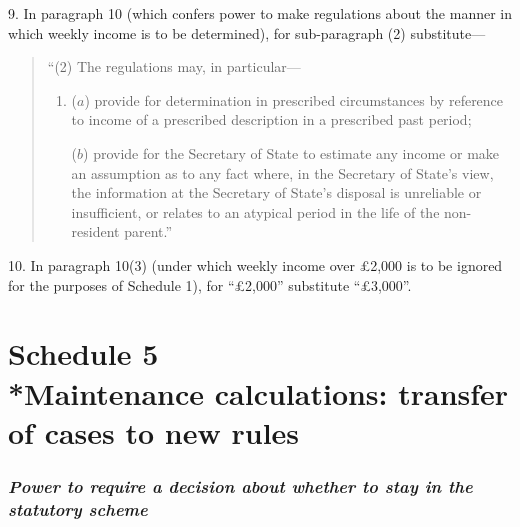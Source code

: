 \documentclass[12pt,a4paper]{article}
\begin{document}
9. In paragraph 10 (which confers power to make regulations about the manner in which weekly income is to be determined), for sub-paragraph (2) substitute—
\begin{quotation}
“(2) The regulations may, in particular—
\begin{enumerate}\item[]
($a$) provide for determination in prescribed circumstances by reference to income of a prescribed description in a prescribed past period;

($b$) provide for the Secretary of State to estimate any income or make an assumption as to any fact where, in the Secretary of State's view, the information at the Secretary of State's disposal is unreliable or insufficient, or relates to an atypical period in the life of the non-resident parent.”
\end{enumerate}
\end{quotation}


\medskip

10. In paragraph 10(3) (under which weekly income over £2,000 is to be ignored for the purposes of Schedule 1), for “£2,000” substitute “£3,000”.

\part[Schedule 5 --- Maintenance calculations: transfer of cases to new rules]{Schedule 5\\*Maintenance calculations: transfer of cases to new rules}

\renewcommand\parthead{--- Schedule 5}

\section*{\itshape Power to require a decision about whether to stay in the statutory scheme}

%
%
%
%
%
%
\end{document}
